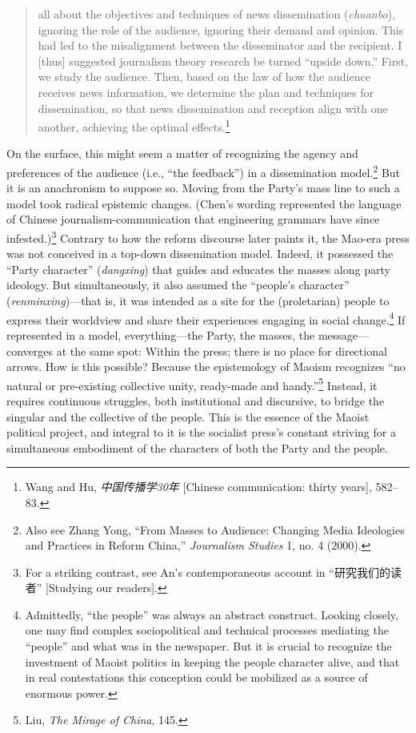 \documentclass{tufte-handout}
\begin{document}
\begin{CJK*}{UTF8}{gbsn}
\begin{quote}
all about the objectives and techniques of news dissemination
(\emph{chuanbo}), ignoring the role of the audience, ignoring their
demand and opinion. This had led to the misalignment between the
disseminator and the recipient. I {[}thus{]} suggested journalism theory
research be turned ``upside down.'' First, we study the audience. Then,
based on the law of how the audience receives news information, we
determine the plan and techniques for dissemination, so that news
dissemination and reception align with one another, achieving the
optimal effects.\footnote{Wang and Hu, \emph{中国传播学30年} {[}Chinese
  communication: thirty years{]}, 582--83.}
\end{quote}

\noindent On the surface, this might seem a matter of recognizing the agency and
preferences of the audience (i.e., ``the feedback'') in a dissemination
model.\footnote{Also see Zhang Yong, ``From Masses to Audience: Changing
  Media Ideologies and Practices in Reform China,'' \emph{Journalism
  Studies} 1, no. 4 (2000).} But it is an anachronism to suppose so.
Moving from the Party's mass line to such a model took radical epistemic
changes. (Chen's wording represented the language of Chinese
journalism-communication that engineering grammars have since
infested.)\footnote{For a striking contrast, see An's contemporaneous
  account in ``研究我们的读者'' {[}Studying our readers{]}.} Contrary to
how the reform discourse later paints it, the Mao-era press was not
conceived in a top-down dissemination model. Indeed, it possessed the
``Party character'' (\emph{dangxing}) that guides and educates the
masses along party ideology. But simultaneously, it also assumed the
``people's character'' (\emph{renminxing})---that is, it was intended as
a site for the (proletarian) people to express their worldview and share
their experiences engaging in social change.\footnote{Admittedly, ``the
  people'' was always an abstract construct. Looking closely, one may
  find complex sociopolitical and technical processes mediating the
  ``people'' and what was in the newspaper. But it is crucial to
  recognize the investment of Maoist politics in keeping the people
  character alive, and that in real contestations this conception could
  be mobilized as a source of enormous power.} If represented in a
model, everything---the Party, the masses, the message---converges at
the same spot: Within the press; there is no place for directional
arrows. How is this possible? Because the epistemology of Maoism
recognizes ``no natural or pre-existing collective unity, ready-made and
handy.''\footnote{Liu, \emph{The Mirage of China}, 145.} Instead, it
requires continuous struggles, both institutional and discursive, to
bridge the singular and the collective of the people. This is the
essence of the Maoist political project, and integral to it is the
socialist press's constant striving for a simultaneous embodiment of the characters of both the Party and the people.

\end{CJK*}
\end{document}
